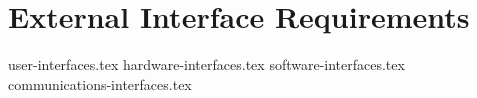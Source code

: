 \chapter{External Interface Requirements} \label{chap:externalinterfacerequirements}

{user-interfaces.tex}
\newpage
{hardware-interfaces.tex}
\newpage
{software-interfaces.tex}
\newpage
{communications-interfaces.tex}
\newpage
